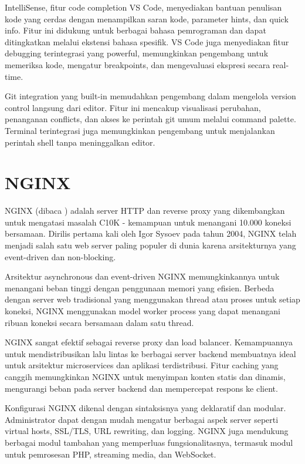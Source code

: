 \documentclass[a4paper,12pt]{report}
\begin{document}
IntelliSense, fitur code completion VS Code, menyediakan bantuan penulisan kode yang cerdas dengan menampilkan saran kode, parameter hints, dan quick info. Fitur ini didukung untuk berbagai bahasa pemrograman dan dapat ditingkatkan melalui ekstensi bahasa spesifik. VS Code juga menyediakan fitur debugging terintegrasi yang powerful, memungkinkan pengembang untuk memeriksa kode, mengatur breakpoints, dan mengevaluasi ekspresi secara real-time.

Git integration yang built-in memudahkan pengembang dalam mengelola version control langsung dari editor. Fitur ini mencakup visualisasi perubahan, penanganan conflicts, dan akses ke perintah git umum melalui command palette. Terminal terintegrasi juga memungkinkan pengembang untuk menjalankan perintah shell tanpa meninggalkan editor.

\section{NGINX}
NGINX (dibaca ) adalah server HTTP dan reverse proxy yang dikembangkan untuk mengatasi masalah C10K - kemampuan untuk menangani 10.000 koneksi bersamaan. Dirilis pertama kali oleh Igor Sysoev pada tahun 2004, NGINX telah menjadi salah satu web server paling populer di dunia karena arsitekturnya yang event-driven dan non-blocking.

Arsitektur asynchronous dan event-driven NGINX memungkinkannya untuk menangani beban tinggi dengan penggunaan memori yang efisien. Berbeda dengan server web tradisional yang menggunakan thread atau proses untuk setiap koneksi, NGINX menggunakan model worker process yang dapat menangani ribuan koneksi secara bersamaan dalam satu thread.

NGINX sangat efektif sebagai reverse proxy dan load balancer. Kemampuannya untuk mendistribusikan lalu lintas ke berbagai server backend membuatnya ideal untuk arsitektur microservices dan aplikasi terdistribusi. Fitur caching yang canggih memungkinkan NGINX untuk menyimpan konten statis dan dinamis, mengurangi beban pada server backend dan mempercepat respons ke client.

Konfigurasi NGINX dikenal dengan sintaksisnya yang deklaratif dan modular. Administrator dapat dengan mudah mengatur berbagai aspek server seperti virtual hosts, SSL/TLS, URL rewriting, dan logging. NGINX juga mendukung berbagai modul tambahan yang memperluas fungsionalitasnya, termasuk modul untuk pemrosesan PHP, streaming media, dan WebSocket.
\end{document}
